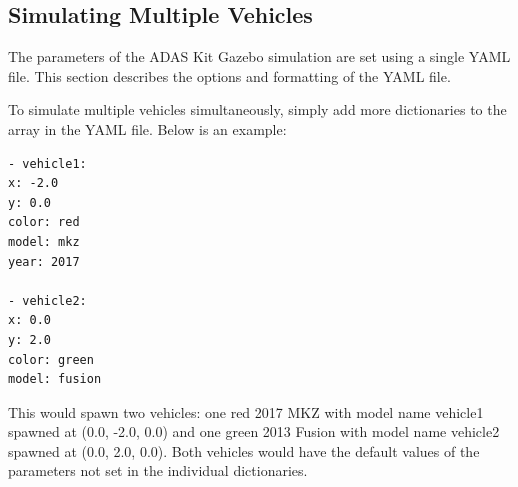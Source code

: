 \subsection{Simulating Multiple Vehicles}

The parameters of the ADAS Kit Gazebo simulation are set using a single YAML file. This section describes the options and formatting of the YAML file.

To simulate multiple vehicles simultaneously, simply add more dictionaries to the array in the YAML file. Below is an example:

\begin{lstlisting}[language=XML]
- vehicle1: 
x: -2.0
y: 0.0
color: red
model: mkz
year: 2017

- vehicle2:
x: 0.0
y: 2.0
color: green
model: fusion
\end{lstlisting}

This would spawn two vehicles: one red 2017 MKZ with model name vehicle1 spawned at (0.0, -2.0, 0.0) and one green 2013 Fusion with model name vehicle2 spawned at (0.0, 2.0, 0.0). Both vehicles would have the default values of the parameters not set in the individual dictionaries.


%



